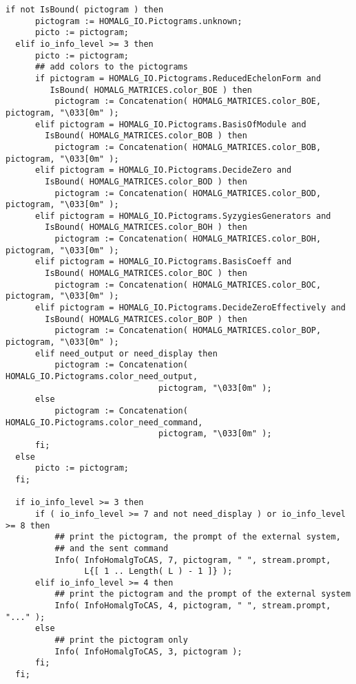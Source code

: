 \documentclass[a4paper,11pt]{report}
\begin{document}
{{{\begin{Verbatim}[fontsize=\small,frame=single,label=Code]
  if not IsBound( pictogram ) then
      pictogram := HOMALG_IO.Pictograms.unknown;
      picto := pictogram;
  elif io_info_level >= 3 then
      picto := pictogram;
      ## add colors to the pictograms
      if pictogram = HOMALG_IO.Pictograms.ReducedEchelonForm and
         IsBound( HOMALG_MATRICES.color_BOE ) then
          pictogram := Concatenation( HOMALG_MATRICES.color_BOE, pictogram, "\033[0m" );
      elif pictogram = HOMALG_IO.Pictograms.BasisOfModule and
        IsBound( HOMALG_MATRICES.color_BOB ) then
          pictogram := Concatenation( HOMALG_MATRICES.color_BOB, pictogram, "\033[0m" );
      elif pictogram = HOMALG_IO.Pictograms.DecideZero and
        IsBound( HOMALG_MATRICES.color_BOD ) then
          pictogram := Concatenation( HOMALG_MATRICES.color_BOD, pictogram, "\033[0m" );
      elif pictogram = HOMALG_IO.Pictograms.SyzygiesGenerators and
        IsBound( HOMALG_MATRICES.color_BOH ) then
          pictogram := Concatenation( HOMALG_MATRICES.color_BOH, pictogram, "\033[0m" );
      elif pictogram = HOMALG_IO.Pictograms.BasisCoeff and
        IsBound( HOMALG_MATRICES.color_BOC ) then
          pictogram := Concatenation( HOMALG_MATRICES.color_BOC, pictogram, "\033[0m" );
      elif pictogram = HOMALG_IO.Pictograms.DecideZeroEffectively and
        IsBound( HOMALG_MATRICES.color_BOP ) then
          pictogram := Concatenation( HOMALG_MATRICES.color_BOP, pictogram, "\033[0m" );
      elif need_output or need_display then
          pictogram := Concatenation( HOMALG_IO.Pictograms.color_need_output,
                               pictogram, "\033[0m" );
      else
          pictogram := Concatenation( HOMALG_IO.Pictograms.color_need_command,
                               pictogram, "\033[0m" );
      fi;
  else
      picto := pictogram;
  fi;
  
  if io_info_level >= 3 then
      if ( io_info_level >= 7 and not need_display ) or io_info_level >= 8 then
          ## print the pictogram, the prompt of the external system,
          ## and the sent command
          Info( InfoHomalgToCAS, 7, pictogram, " ", stream.prompt,
                L{[ 1 .. Length( L ) - 1 ]} );
      elif io_info_level >= 4 then
          ## print the pictogram and the prompt of the external system
          Info( InfoHomalgToCAS, 4, pictogram, " ", stream.prompt, "..." );
      else
          ## print the pictogram only
          Info( InfoHomalgToCAS, 3, pictogram );
      fi;
  fi;
\end{Verbatim}
 }

 }

}
\end{document}
